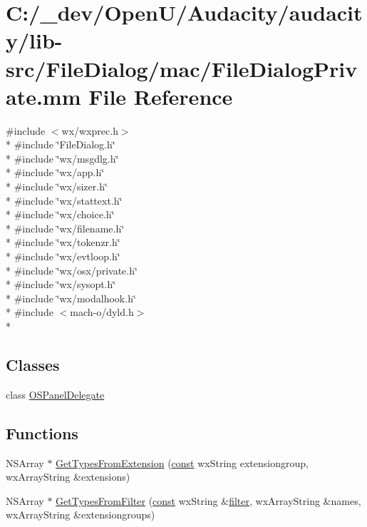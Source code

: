 \hypertarget{_file_dialog_private_8mm}{}\section{C\+:/\+\_\+dev/\+Open\+U/\+Audacity/audacity/lib-\/src/\+File\+Dialog/mac/\+File\+Dialog\+Private.mm File Reference}
\label{_file_dialog_private_8mm}
{\ttfamily \#include $<$wx/wxprec.\+h$>$}\\*
{\ttfamily \#include \char`\"{}File\+Dialog.\+h\char`\"{}}\\*
{\ttfamily \#include \char`\"{}wx/msgdlg.\+h\char`\"{}}\\*
{\ttfamily \#include \char`\"{}wx/app.\+h\char`\"{}}\\*
{\ttfamily \#include \char`\"{}wx/sizer.\+h\char`\"{}}\\*
{\ttfamily \#include \char`\"{}wx/stattext.\+h\char`\"{}}\\*
{\ttfamily \#include \char`\"{}wx/choice.\+h\char`\"{}}\\*
{\ttfamily \#include \char`\"{}wx/filename.\+h\char`\"{}}\\*
{\ttfamily \#include \char`\"{}wx/tokenzr.\+h\char`\"{}}\\*
{\ttfamily \#include \char`\"{}wx/evtloop.\+h\char`\"{}}\\*
{\ttfamily \#include \char`\"{}wx/osx/private.\+h\char`\"{}}\\*
{\ttfamily \#include \char`\"{}wx/sysopt.\+h\char`\"{}}\\*
{\ttfamily \#include \char`\"{}wx/modalhook.\+h\char`\"{}}\\*
{\ttfamily \#include $<$mach-\/o/dyld.\+h$>$}\\*
\subsection*{Classes}
\begin{DoxyCompactItemize}
\item 
class \hyperlink{interface_o_s_panel_delegate}{O\+S\+Panel\+Delegate}
\end{DoxyCompactItemize}
\subsection*{Functions}
\begin{DoxyCompactItemize}
\item 
N\+S\+Array $\ast$ \hyperlink{_file_dialog_private_8mm_aec15178f6fa3d42f125079e6e4d02721}{Get\+Types\+From\+Extension} (\hyperlink{getopt1_8c_a2c212835823e3c54a8ab6d95c652660e}{const} wx\+String extensiongroup, wx\+Array\+String \&extensions)
\item 
N\+S\+Array $\ast$ \hyperlink{_file_dialog_private_8mm_afc95f0abab9ba567d1a30b871aa7eecf}{Get\+Types\+From\+Filter} (\hyperlink{getopt1_8c_a2c212835823e3c54a8ab6d95c652660e}{const} wx\+String \&\hyperlink{record_8c_ac92bde2b71b52b0ec8a21906c4101b41}{filter}, wx\+Array\+String \&names, wx\+Array\+String \&extensiongroups)
\end{DoxyCompactItemize}


